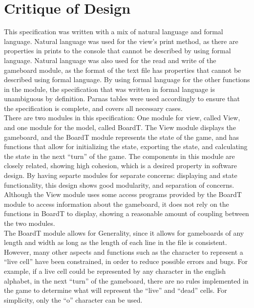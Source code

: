 \documentclass[12pt]{article}
\begin{document}
\newpage

\section*{Critique of Design}

This specification was written with a mix of natural language and formal language. Natural language was used for the view's print method, as there are properties in prints to the console that cannot be described by using formal language. Natural language was also used for the read and write of the gameboard module, as the format of the text file has properties that cannot be described using formal language. By using formal language for the other functions in the module, the specification that was written in formal language is unambiguous by definition. Parnas tables were used accordingly to ensure that the specification is complete, and covers all necessary cases.\\

There are two modules in this specification: One module for view, called View, and one module for the model, called BoardT. The View module displays the gameboard, and the BoardT module represents the state of the game, and has functions that allow for initializing the state, exporting the state, and calculating the state in the next  ``turn'' of the game. The components in this module are closely related, showing high cohesion, which is a desired property in software design. By having separte modules for  separate concerns: displaying and state functionality, this design shows good modularity, and separation of concerns. Although the View module uses some access programs provided by the BoardT module to access information about the gameboard, it does not rely on the functions in BoardT to display, showing a reasonable amount of coupling between the two modules.\\

The BoardT module allows for Generality, since it allows for gameboards of any length and width as long as the length of each line in the file is consistent. However, many other aspects and functions such as the character to represent a ``live cell'' have been constrained, in order to reduce possible errors and bugs. For example, if a live cell could be represented by any character in the english alphabet, in the next ``turn'' of the gameboard, there are no rules implemented in the game to determine what will represent the ``live'' and ``dead'' cells. For simplicity, only the ``o'' character can be used.\\
\end{document}

